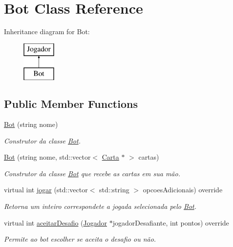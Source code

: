 \hypertarget{class_bot}{}\section{Bot Class Reference}
\label{class_bot}
Inheritance diagram for Bot\+:\begin{figure}[H]
\begin{center}
\leavevmode
\includegraphics[height=2.000000cm]{class_bot}
\end{center}
\end{figure}
\subsection*{Public Member Functions}
\begin{DoxyCompactItemize}
\item 
\mbox{\hyperlink{class_bot_aaae843b6e580397800522406e583f1b0}{Bot}} (string nome)
\begin{DoxyCompactList}\small\item\em Construtor da classe \mbox{\hyperlink{class_bot}{Bot}}. \end{DoxyCompactList}\item 
\mbox{\hyperlink{class_bot_af86af144f9ce5174c99a83f9df2b4c86}{Bot}} (string nome, std\+::vector$<$ \mbox{\hyperlink{class_carta}{Carta}} $\ast$ $>$ cartas)
\begin{DoxyCompactList}\small\item\em Construtor da classe \mbox{\hyperlink{class_bot}{Bot}} que recebe as cartas em sua mão. \end{DoxyCompactList}\item 
virtual int \mbox{\hyperlink{class_bot_ab3d1a1563bada68fef705b2ca0af6386}{jogar}} (std\+::vector$<$ std\+::string $>$ opcoes\+Adicionais) override
\begin{DoxyCompactList}\small\item\em Retorna um inteiro correspondete a jogada selecionada pelo \mbox{\hyperlink{class_bot}{Bot}}. \end{DoxyCompactList}\item 
virtual int \mbox{\hyperlink{class_bot_a203bfaaa13441296a94dd157fc253631}{aceitar\+Desafio}} (\mbox{\hyperlink{class_jogador}{Jogador}} $\ast$jogador\+Desafiante, int pontos) override
\begin{DoxyCompactList}\small\item\em Permite ao bot escolher se aceita o desafio ou não. \end{DoxyCompactList}\end{DoxyCompactItemize}
